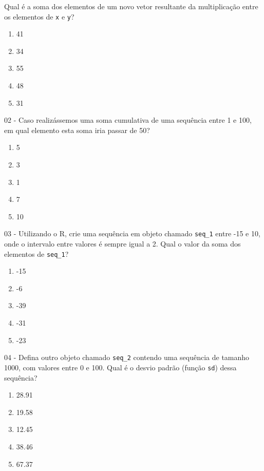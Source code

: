 \documentclass[
  11pt,
]{book}
\providecommand{\tightlist}{%
  \setlength{\itemsep}{0pt}\setlength{\parskip}{0pt}}
\begin{document}
Qual é a soma dos elementos de um novo vetor resultante da multiplicação entre os elementos de \texttt{x} e \texttt{y}?

\begin{enumerate}
\def\labelenumi{\alph{enumi})}
\tightlist
\item
  41
\item
  34
\item
  55
\item
  48
\item
  31
\end{enumerate}

02 -
Caso realizássemos uma soma cumulativa de uma sequência entre 1 e 100, em qual elemento esta soma iria passar de 50?

\begin{enumerate}
\def\labelenumi{\alph{enumi})}
\tightlist
\item
  5
\item
  3
\item
  1
\item
  7
\item
  10
\end{enumerate}

03 -
Utilizando o R, crie uma sequência em objeto chamado \texttt{seq\_1} entre -15 e 10, onde o intervalo entre valores é sempre igual a 2. Qual o valor da soma dos elementos de \texttt{seq\_1}?

\begin{enumerate}
\def\labelenumi{\alph{enumi})}
\tightlist
\item
  -15
\item
  -6
\item
  -39
\item
  -31
\item
  -23
\end{enumerate}

04 -
Defina outro objeto chamado \texttt{seq\_2} contendo uma sequência de tamanho 1000, com valores entre 0 e 100. Qual é o desvio padrão (função \texttt{sd}) dessa sequência?

\begin{enumerate}
\def\labelenumi{\alph{enumi})}
\tightlist
\item
  28.91
\item
  19.58
\item
  12.45
\item
  38.46
\item
  67.37
\end{enumerate}
\end{document}
